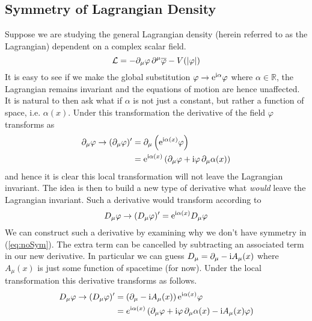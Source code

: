 \subsection{Symmetry of Lagrangian Density}\label{lagdensym}
Suppose we are studying the general Lagrangian density (herein referred to as
the Lagrangian) dependent on a complex scalar field.
\begin{equation}\label{eq:complexScalar}
    \mathcal{L} = -\partial_\mu\varphi\,\partial^\mu\overline{\varphi} - V(|\varphi|)
\end{equation}
It is easy to see if we make the global substitution \(\varphi\to\mathrm{e}^{\mathrm{i} \alpha}\varphi\) where \(\alpha\in \mathbb{R}\), the Lagrangian remains invariant and the equations of motion are hence unaffected. It is natural to then ask what if \(\alpha\) is not just a constant, but rather a function of space, i.e. \(\alpha(x)\). Under this transformation the derivative of the field \(\varphi\) transforms as
\begin{align}\label{eq:noSym}
    \partial_\mu\varphi\to (\partial_\mu\varphi)' & = \partial_\mu\left(\mathrm{e}^{\mathrm{i}\alpha(x)}\varphi\right) \nonumber                           \\
                                                  & = \mathrm{e}^{\mathrm{i}\alpha(x)}\left(\partial_\mu\varphi + \mathrm{i}\varphi\,\partial_\mu\alpha(x)\right)
\end{align}
and hence it is clear this local transformation will not leave the Lagrangian
invariant. The idea is then to build a new type of derivative what
\textit{would} leave the Lagrangian invariant. Such a derivative would transform
according to
\begin{equation*}
    D_\mu\varphi\to(D_\mu\varphi)' = \mathrm{e}^{\mathrm{i}\alpha(x)}D_\mu\varphi
\end{equation*}
We can construct such a derivative by examining why we don't have symmetry in
(\ref{eq:noSym}). The extra term can be cancelled by subtracting an associated
term in our new derivative. In particular we can guess
\(D_\mu = \partial_\mu - \mathrm{i} A_\mu(x)\) where \(A_\mu(x)\) is just some function
of spacetime (for now). Under the local transformation this derivative
transforms as follows.
\begin{align*}
    D_\mu\varphi \to (D_\mu\varphi)' & = \left(\partial_\mu  - \mathrm{i} A_\mu(x)\right)\mathrm{e}^{\mathrm{i}\alpha(x)}\varphi                                             \\
                                     & = e^{\mathrm{i}\alpha(x)}\left(\partial_\mu\varphi + \mathrm{i} \varphi\, \partial_\mu \alpha(x) - \mathrm{i} A_\mu(x)\varphi\right)
\end{align*}
